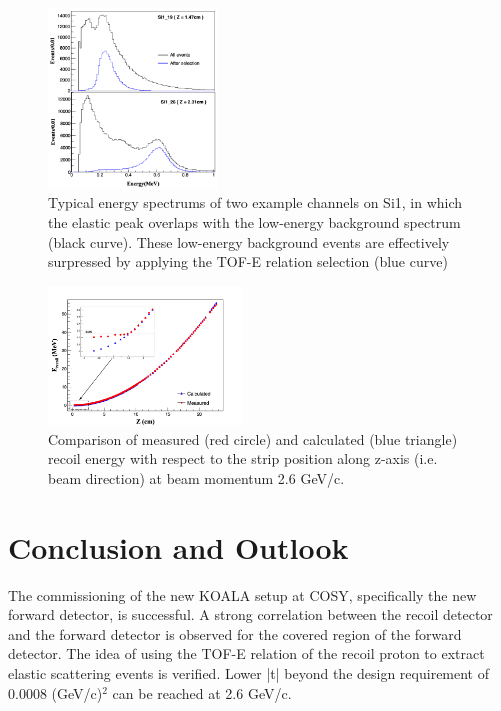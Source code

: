 \documentclass[number,5p]{elsarticle}
\begin{document}
\begin{figure}[h!]
  \centering
  \includegraphics[width=0.4\textwidth]{./comparison_tof_e_cut.png}
  \caption{Typical energy spectrums of two example channels on Si1, in which the elastic peak overlaps with the low-energy background spectrum (black curve). These low-energy background events are effectively surpressed by applying the TOF-E relation selection (blue curve)}
  \label{fig:cut}
\end{figure}


\begin{figure}[h!]
  \centering
  \includegraphics[width=0.46\textwidth]{./calc_vs_measured_combined.png}
  \caption{
    Comparison of measured (red circle) and calculated (blue triangle) recoil energy with respect to the strip position along z-axis (i.e. beam direction) at beam momentum 2.6 GeV/c.}
  \label{fig:measured_vs_calculated}
\end{figure}


\section{Conclusion and Outlook}
\label{sec:conclusion}

The commissioning of the new KOALA setup at COSY, specifically the new forward detector, is successful.
A strong correlation between the recoil detector and the forward detector is
observed for the covered region of the forward detector.
The idea of using the TOF-E relation of the recoil proton to extract elastic
scattering events is verified.
Lower |t| beyond the design requirement of 0.0008 (GeV/c)$^2$ can be reached at 2.6 GeV/c. 
\end{document}
